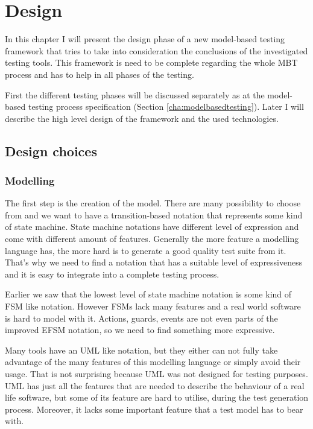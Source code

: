 \chapter{Design}
\label{cha:design}

In this chapter I will present the design phase of a new model-based testing framework that tries to take into consideration the conclusions of the investigated testing tools. This framework is need to be complete regarding the whole MBT process and has to help in all phases of the testing.

First the different testing phases will be discussed separately as at the model-based testing process specification (Section \ref{cha:modelbasedtesting}). Later I will describe the high level design of the framework and the used technologies.

\section{Design choices}
\label{sec:designchoices}

\subsection{Modelling}
\label{sub:designmodelling}

The first step is the creation of the model. There are many possibility to choose from and we want to have a transition-based notation that represents some kind of state machine. State machine notations have different level of expression and come with different amount of features. Generally the more feature a modelling language has, the more hard is to generate a good quality test suite from it. That's why we need to find a notation that has a suitable level of expressiveness and it is easy to integrate into a complete testing process.

Earlier we saw that the lowest level of state machine notation is some kind of FSM like notation. However FSMs lack many features and a real world software is hard to model with it. Actions, guards, events are not even parts of the improved EFSM notation, so we need to find something more expressive.

Many tools have an UML like notation, but they either can not fully take advantage of the many features of this modelling language or simply avoid their usage. That is not surprising because UML was not designed for testing purposes. UML has just all the features that are needed to describe the behaviour of a real life software, but some of its feature are hard to utilise, during the test generation process. Moreover, it lacks some important feature that a test model has to bear with.


